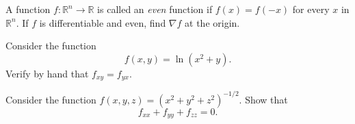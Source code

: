 \documentclass[openany]{book}
\newcommand{\R}{\mathbb{R}}
\begin{document}
\begin{prob}
    A function $f\colon\R^n\to\R$ is called an \textit{even} function if $f(x)=f(-x)$ for every $x$ in $\R^n$. If $f$ is differentiable and even, find $\nabla f$ at the origin.
\end{prob}



\begin{prob}
    Consider the function
    \[f(x,y)={\ln(x^2+y)}.\]
    Verify by hand that $f_{xy}=f_{yx}$.
\end{prob}


\begin{prob}
    Consider the function $f(x,y,z)=\left(x^2+y^2+z^2\right)^{-1/2}$. Show that
    \[f_{xx}+f_{yy}+f_{zz}=0.\]
\end{prob}
\end{document}
